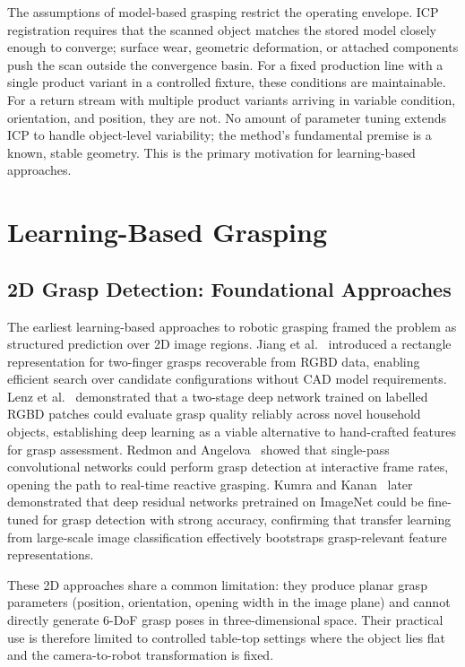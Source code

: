 \documentclass[12pt, a4paper]{report}
\begin{document}
The assumptions of model-based grasping restrict the operating envelope. ICP registration requires that the scanned object matches the stored model closely enough to converge; surface wear, geometric deformation, or attached components push the scan outside the convergence basin. For a fixed production line with a single product variant in a controlled fixture, these conditions are maintainable. For a return stream with multiple product variants arriving in variable condition, orientation, and position, they are not. No amount of parameter tuning extends ICP to handle object-level variability; the method's fundamental premise is a known, stable geometry. This is the primary motivation for learning-based approaches.

\section{Learning-Based Grasping}
\label{sec:learning-based-grasping}

\subsection{2D Grasp Detection: Foundational Approaches}
\label{sec:2d-grasp-detection}

The earliest learning-based approaches to robotic grasping framed the problem as structured prediction over 2D image regions. Jiang et al.~\cite{jiang2011efficient} introduced a rectangle representation for two-finger grasps recoverable from RGBD data, enabling efficient search over candidate configurations without CAD model requirements. Lenz et al.~\cite{lenz2015deep} demonstrated that a two-stage deep network trained on labelled RGBD patches could evaluate grasp quality reliably across novel household objects, establishing deep learning as a viable alternative to hand-crafted features for grasp assessment. Redmon and Angelova~\cite{redmon2015realtime} showed that single-pass convolutional networks could perform grasp detection at interactive frame rates, opening the path to real-time reactive grasping. Kumra and Kanan~\cite{kumra2017robotic} later demonstrated that deep residual networks pretrained on ImageNet could be fine-tuned for grasp detection with strong accuracy, confirming that transfer learning from large-scale image classification effectively bootstraps grasp-relevant feature representations.

These 2D approaches share a common limitation: they produce planar grasp parameters (position, orientation, opening width in the image plane) and cannot directly generate 6-DoF grasp poses in three-dimensional space. Their practical use is therefore limited to controlled table-top settings where the object lies flat and the camera-to-robot transformation is fixed.
\end{document}
